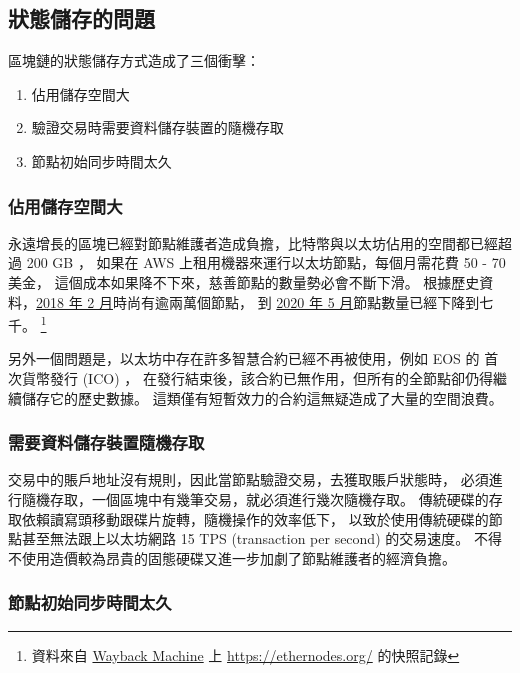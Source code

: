 \subsection{狀態儲存的問題}

區塊鏈的狀態儲存方式造成了三個衝擊：

\begin{enumerate}
  \item 佔用儲存空間大
  \item 驗證交易時需要資料儲存裝置的隨機存取
  \item 節點初始同步時間太久
\end{enumerate}

\subsubsection{佔用儲存空間大}

永遠增長的區塊已經對節點維護者造成負擔，比特幣與以太坊佔用的空間都已經超過 200 GB ，
如果在 AWS 上租用機器來運行以太坊節點，每個月需花費 50 - 70 美金，
這個成本如果降不下來，慈善節點的數量勢必會不斷下滑。
根據歷史資料，\href{https://web.archive.org/web/20180224224831/https://www.ethernodes.org/network/1}{2018 年 2 月}時尚有逾兩萬個節點，
到 \href{https://web.archive.org/web/20200512075927/https://www.ethernodes.org/}{2020 年 5 月}節點數量已經下降到七千。
\footnote{資料來自 \href{https://web.archive.org}{Wayback Machine} 上 \url{https://ethernodes.org/} 的快照記錄}

另外一個問題是，以太坊中存在許多智慧合約已經不再被使用，例如 EOS 的 首次貨幣發行 (ICO) ，
在發行結束後，該合約已無作用，但所有的全節點卻仍得繼續儲存它的歷史數據。
這類僅有短暫效力的合約這無疑造成了大量的空間浪費。

\subsubsection{需要資料儲存裝置隨機存取}
交易中的賬戶地址沒有規則，因此當節點驗證交易，去獲取賬戶狀態時，
必須進行隨機存取，一個區塊中有幾筆交易，就必須進行幾次隨機存取。
傳統硬碟的存取依賴讀寫頭移動跟碟片旋轉，隨機操作的效率低下，
以致於使用傳統硬碟的節點甚至無法跟上以太坊網路 15 TPS (transaction per second) 的交易速度。
不得不使用造價較為昂貴的固態硬碟又進一步加劇了節點維護者的經濟負擔。

\subsubsection{節點初始同步時間太久}

